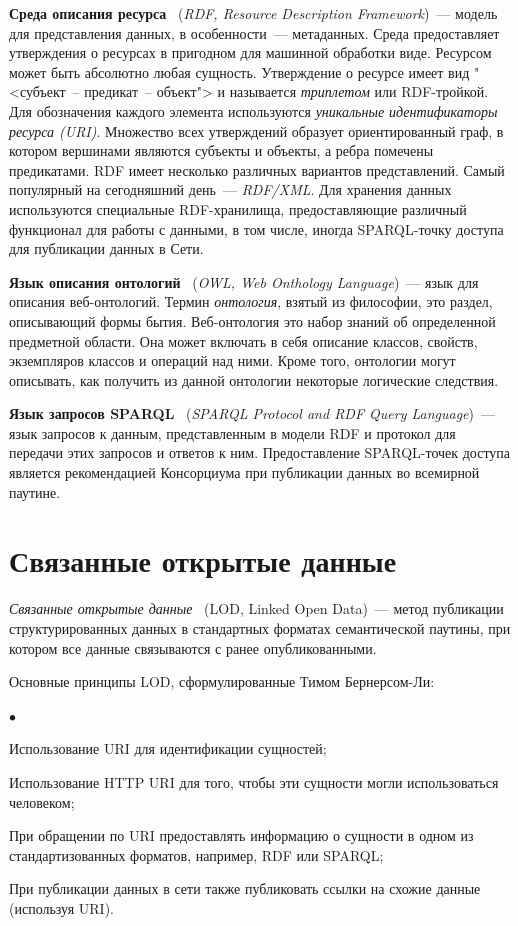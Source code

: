 \documentclass[a4paper, final, 14 pt]{extarticle}
\newenvironment{compactlist} {
  \begin{list}{{$\bullet$}} {
    \setlength\partopsep{0pt}
    \setlength\parskip{0pt}
    \setlength\parsep{0pt}
    \setlength\topsep{0pt}
    \setlength\itemsep{0pt}
  }
}{
  \end{list}
  \smallskip
}
\begin{document}
\textbf{Среда описания ресурса}~\cite{web:rdf} (\emph{RDF, Resource Description Framework})~--- модель для 
представления данных, в особенности~--- метаданных. Среда предоставляет утверждения о ресурсах в 
пригодном для машинной обработки виде. Ресурсом может быть абсолютно любая сущность. Утверждение о 
ресурсе имеет вид "<субъект~-- предикат~-- объект"> и называется \emph{триплетом} или RDF-тройкой. 
Для обозначения каждого элемента используются \emph{уникальные идентификаторы ресурса (URI)}. 
Множество всех утверждений образует ориентированный граф, в котором вершинами являются 
субъекты и объекты, а ребра помечены предикатами. RDF имеет несколько различных вариантов представлений. 
Самый популярный на сегодняшний день~--- \emph{RDF/XML}. Для хранения данных используются специальные 
RDF-хранилища, предоставляющие различный функционал для работы с данными, в том числе, иногда 
SPARQL-точку доступа для публикации данных в Сети.

\textbf{Язык описания онтологий}~\cite{web:owl} (\emph{OWL, Web Onthology Language})~--- язык для описания
веб-онтологий. Термин \emph{онтология}, взятый из философии, это раздел, описывающий формы бытия.
Веб-онтология это набор знаний об определенной предметной области. Она может включать в себя описание
классов, свойств, экземпляров классов и операций над ними. Кроме того, онтологии могут описывать,
как получить из данной онтологии некоторые логические следствия.

\textbf{Язык запросов SPARQL}~\cite{web:sparql} (\emph{SPARQL Protocol and RDF Query Language})~--- язык
запросов к данным, представленным в модели RDF и протокол для передачи этих запросов и ответов к ним.
Предоставление SPARQL-точек доступа является рекомендацией Консорциума при публикации данных во
всемирной паутине.

\bigskip
\section{Связанные открытые данные}

\emph{Связанные открытые данные}~\cite{article:lod} (LOD, Linked Open Data)~--- метод публикации структурированных 
данных в стандартных форматах семантической паутины, при котором все данные связываются с ранее 
опубликованными. 

Основные принципы LOD, сформулированные Тимом Бернерсом-Ли:
\begin{compactlist}
  \item Использование URI для идентификации сущностей;
  \item Использование HTTP URI для того, чтобы эти сущности могли использоваться человеком;
  \item При обращении по URI предоставлять информацию о сущности в одном из стандартизованных 
  форматов, например, RDF или SPARQL;
  \item При публикации данных в сети также публиковать ссылки на схожие данные (используя URI).
\end{compactlist}
\end{document}
